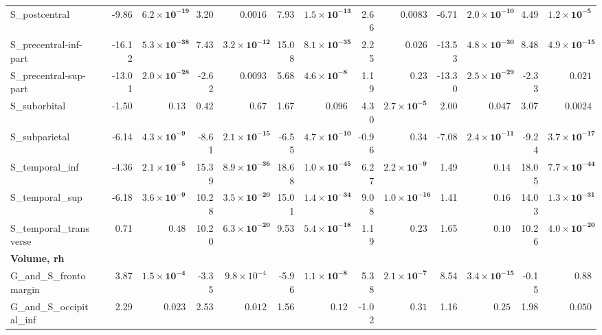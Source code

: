 {\begin{longtable}{llrrrrrrrrrrrr}
S\_postcentral &  & -9.86 & $\mathbf{6.2{\times}10^{-19}}$ & 3.20 & $0.0016$ & 7.93 & $\mathbf{1.5{\times}10^{-13}}$ & 2.66 & $0.0083$ & -6.71 & $\mathbf{2.0{\times}10^{-10}}$ & 4.49 & $\mathbf{1.2{\times}10^{-5}}$ \\
S\_precentral-inf-part &  & -16.12 & $\mathbf{5.3{\times}10^{-38}}$ & 7.43 & $\mathbf{3.2{\times}10^{-12}}$ & 15.08 & $\mathbf{8.1{\times}10^{-35}}$ & 2.25 & $0.026$ & -13.53 & $\mathbf{4.8{\times}10^{-30}}$ & 8.48 & $\mathbf{4.9{\times}10^{-15}}$ \\
S\_precentral-sup-part &  & -13.01 & $\mathbf{2.0{\times}10^{-28}}$ & -2.62 & $0.0093$ & 5.68 & $\mathbf{4.6{\times}10^{-8}}$ & 1.19 & $0.23$ & -13.30 & $\mathbf{2.5{\times}10^{-29}}$ & -2.33 & $0.021$ \\
S\_suborbital &  & -1.50 & $0.13$ & 0.42 & $0.67$ & 1.67 & $0.096$ & 4.30 & $\mathbf{2.7{\times}10^{-5}}$ & 2.00 & $0.047$ & 3.07 & $0.0024$ \\
S\_subparietal &  & -6.14 & $\mathbf{4.3{\times}10^{-9}}$ & -8.61 & $\mathbf{2.1{\times}10^{-15}}$ & -6.55 & $\mathbf{4.7{\times}10^{-10}}$ & -0.96 & $0.34$ & -7.08 & $\mathbf{2.4{\times}10^{-11}}$ & -9.24 & $\mathbf{3.7{\times}10^{-17}}$ \\
S\_temporal\_inf &  & -4.36 & $\mathbf{2.1{\times}10^{-5}}$ & 15.39 & $\mathbf{8.9{\times}10^{-36}}$ & 18.68 & $\mathbf{1.0{\times}10^{-45}}$ & 6.27 & $\mathbf{2.2{\times}10^{-9}}$ & 1.49 & $0.14$ & 18.05 & $\mathbf{7.7{\times}10^{-44}}$ \\
S\_temporal\_sup &  & -6.18 & $\mathbf{3.6{\times}10^{-9}}$ & 10.28 & $\mathbf{3.5{\times}10^{-20}}$ & 15.01 & $\mathbf{1.4{\times}10^{-34}}$ & 9.08 & $\mathbf{1.0{\times}10^{-16}}$ & 1.41 & $0.16$ & 14.03 & $\mathbf{1.3{\times}10^{-31}}$ \\
S\_temporal\_transverse &  & 0.71 & $0.48$ & 10.20 & $\mathbf{6.3{\times}10^{-20}}$ & 9.53 & $\mathbf{5.4{\times}10^{-18}}$ & 1.19 & $0.23$ & 1.65 & $0.10$ & 10.26 & $\mathbf{4.0{\times}10^{-20}}$ \\
\midrule\multicolumn{14}{l}{\textbf{Volume, rh}} \\
G\_and\_S\_frontomargin &  & 3.87 & $\mathbf{1.5{\times}10^{-4}}$ & -3.35 & $9.8{\times}10^{-4}$ & -5.96 & $\mathbf{1.1{\times}10^{-8}}$ & 5.38 & $\mathbf{2.1{\times}10^{-7}}$ & 8.54 & $\mathbf{3.4{\times}10^{-15}}$ & -0.15 & $0.88$ \\
G\_and\_S\_occipital\_inf &  & 2.29 & $0.023$ & 2.53 & $0.012$ & 1.56 & $0.12$ & -1.02 & $0.31$ & 1.16 & $0.25$ & 1.98 & $0.050$ \\

\end{longtable}}
